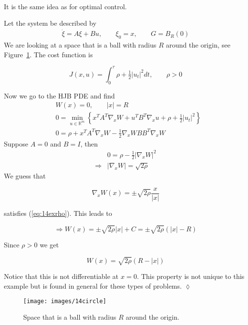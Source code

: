 It is the same idea as for optimal control.

\begin{example}%
\label{ex:14exit}
Let the system be described by
\begin{align*}
\dot{\xi} = A\xi+Bu, \qquad \xi_0 = x, \qquad G=B_R(0)
\end{align*}
We are looking at a space that is a ball with radius $R$ around the origin, see Figure~\ref{fig:14circle}.
The cost function is

\begin{equation*}
J(x,u) = \int_0^\tau \rho + \tfrac{1}{2}|u_t|^2dt, \qquad \rho>0
\end{equation*}

Now we go to the HJB PDE and find
\begin{align*}
&W(x) = 0, \qquad |x|=R \\
&0 = \min_{u\in\mathbb{R}^m} \left\lbrace x^T A^T\nabla_x W + u^T B^T \nabla_x u + \rho + \tfrac{1}{2}|u_t|^2 \right\rbrace \\
&0 = \rho + x^T A^T \nabla_x W - \tfrac{1}{2}\nabla_x WBB^T \nabla_x W
\end{align*}
Suppose $A=0$ and $B=I$, then
\begin{align}
\label{eq:14exrho}
&0 = \rho - \tfrac{1}{2}|\nabla_x W|^2 \nonumber \\
\Rightarrow &|\nabla_x W| = \sqrt{2\rho}
\end{align}
We guess that

\begin{equation*}
\nabla_x W(x) = \pm \sqrt{2\rho}\frac{x}{|x|}
\end{equation*}

satisfies (\ref{eq:14exrho}).
This leads to

\begin{equation*}
\Rightarrow W(x) = \pm\sqrt{2\rho}|x|+C = \pm\sqrt{2\rho}(|x|-R)
\end{equation*}

Since $\rho>0$ we get

\begin{equation*}
W(x) = \sqrt{2\rho}(R-|x|)
\end{equation*}

Notice that this is not differentiable at $x=0$.
This property is not unique to this example but is found in general for these types of problems.
$\lozenge$
\end{example}

\begin{figure}[ht!]
\centering
\texttt{[image: images/14circle]}
\caption{Space that is a ball with radius $R$ around the origin.}%
\label{fig:14circle}
\end{figure}%
